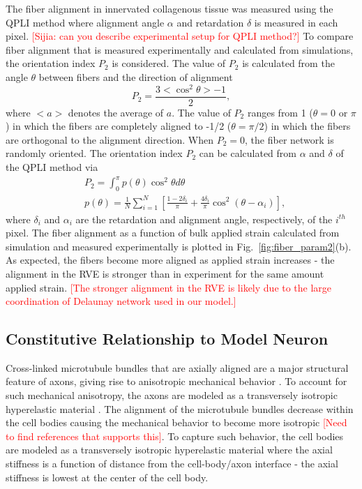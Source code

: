 \documentclass[10pt]{asme2ej}
\begin{document}
The fiber alignment in innervated collagenous tissue was measured using the QPLI method \cite{Quinn:2009bf} where alignment angle $\alpha$ and retardation $\delta$ is measured in each pixel. \textcolor{red}{[Sijia: can you describe experimental setup for QPLI method?]} To compare fiber alignment that is measured experimentally and calculated from simulations, the orientation index $P_2$ is considered. The value of $P_2$ is calculated from the angle $\theta$ between fibers and the direction of alignment
%
\begin{equation}
P_2 = \frac{3 <\cos^2\theta> - 1}{2},
\label{eq:P2_simulation}
\end{equation}
%
where $<a>$ denotes the average of $a$. The value of $P_2$ ranges from 1 ($\theta=0$ or $\pi$) in which the fibers are completely aligned to -1/2 ($\theta=\pi/2$) in which the fibers are orthogonal to the alignment direction. When $P_2=0$, the fiber network is randomly oriented. The orientation index $P_2$ can be calculated from $\alpha$ and $\delta$ of the QPLI method via
%
\begin{align}
&P_2 = \int_0^{\pi} p(\theta) \cos^2\theta d\theta \nonumber\\
&p(\theta) = \frac{1}{N} \sum_{i=1}^N \left[ \frac{1-2\delta_i}{\pi} + \frac{4 \delta_i}{\pi}\cos^2(\theta - \alpha_i)\right],
\label{eq:P2_experiment}
\end{align}
%
where $\delta_i$ and $\alpha_i$ are the retardation and alignment angle, respectively, of the $i^{th}$ pixel. The fiber alignment as a function of bulk applied strain calculated from simulation and measured experimentally is plotted in Fig.\ \ref{fig:fiber_param2}(b). As expected, the fibers become more aligned as applied strain increases - the alignment in the RVE is stronger than in experiment for the same amount applied strain. \textcolor{red}{[The stronger alignment in the RVE is likely due to the large coordination of Delaunay network used in our model.]}

\subsection{Constitutive Relationship to Model Neuron}
Cross-linked microtubule bundles that are axially aligned are a major structural feature of axons, giving rise to anisotropic mechanical behavior \cite{Peter:2012fc}. To account for such mechanical anisotropy, the axons are modeled as a transversely isotropic hyperelastic material \cite{JavierBonet:2008uxa,Bonet:1998vc}. The alignment of the microtubule bundles decrease within the cell bodies causing the mechanical behavior to become more isotropic \textcolor{red}{[Need to find references that supports this]}. To capture such behavior, the cell bodies are modeled as a transversely isotropic hyperelastic material where the axial stiffness is a function of distance from the cell-body/axon interface - the axial stiffness is lowest at the center of the cell body. 
\end{document}
